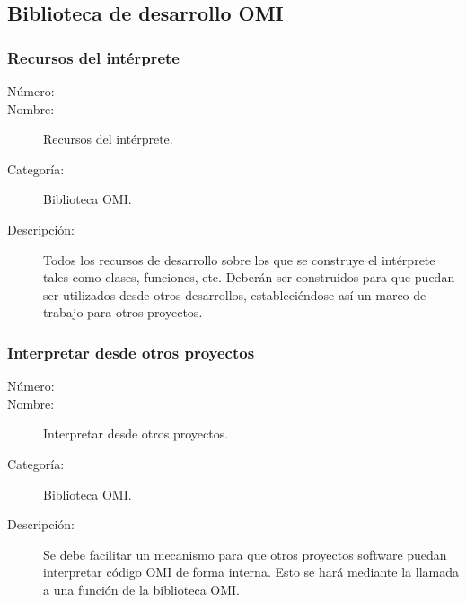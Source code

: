 \subsection{Biblioteca de desarrollo OMI}

\subsubsection{Recursos del intérprete}
	\begin{description}
		\item [Número:] \cn
		\item [Nombre:] Recursos del intérprete.
		\item [Categoría:] Biblioteca OMI.
		\item [Descripción:] Todos los recursos de desarrollo sobre los que se construye el intérprete tales 
      como clases, funciones, etc. Deberán ser construidos para que puedan ser utilizados desde otros desarrollos,
      estableciéndose así un marco de trabajo para otros proyectos. 
	\end {description}

\subsubsection{Interpretar desde otros proyectos}
	\begin{description}
		\item [Número:] \cn
		\item [Nombre:] Interpretar desde otros proyectos.
		\item [Categoría:] Biblioteca OMI.
		\item [Descripción:] Se debe facilitar un mecanismo para que otros proyectos software puedan interpretar código
      OMI de forma interna. Esto se hará mediante la llamada a una función de la biblioteca OMI.
	\end {description}


